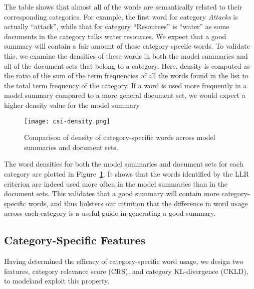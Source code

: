 The table shows that almost all of the words are semantically related to their corresponding categories. For example, the first word for category \emph{Attacks} is actually ``attack'', while that for category ``Resources'' is ``water'' as some documents in the category talks water resources. We expect that a good summary will contain a fair amount of these category-specifc words. 
To validate this, we examine the densities of these words in both the model summaries and 
all of the document sets that belong to a category.
 Here, density is computed as the ratio of the sum of the term frequencies of all the words found in the list to the total term frequency of the category. If a word is used more frequently in a model summary compared to a more general document set, we would expect a higher density value for the model summary.

\begin{figure}[h]
\centering		
\texttt{[image: csi-density.png]}
\caption{Comparison of density of category-specific words across model summaries and document sets.}
\label{fig:csi-density}
\end{figure}

The word densities for both the model summaries and document sets for each category are plotted in Figure~\ref{fig:csi-density}. It shows that the words identified by the LLR criterion are indeed used more often in the model summaries than in the document sets. 
This validates that a good summary will contain more category-specific words, and
thus bolsters our intuition that the difference in word usage across each category is a useful guide in generating a good summary.

\subsection{Category-Specific Features}
Having determined the efficacy of category-specific word usage, we design two features, category relevance score (CRS), and category KL-divergence (CKLD), to modeland exploit this property.

